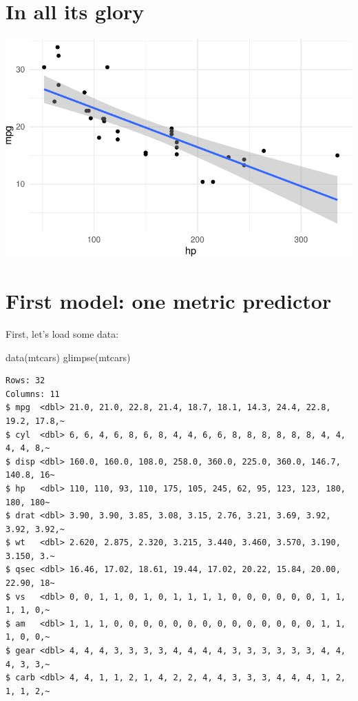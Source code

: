 \documentclass[
  letterpaper,
  DIV=11,
  numbers=noendperiod]{scrreprt}
\newenvironment{Shaded}{\begin{snugshade}}{\end{snugshade}}
\newcommand{\FunctionTok}[1]{\textcolor[rgb]{0.28,0.35,0.67}{#1}}
\newcommand{\NormalTok}[1]{\textcolor[rgb]{0.00,0.23,0.31}{#1}}
\theoremstyle{definition}
\theoremstyle{definition}
\theoremstyle{remark}
\begin{document}
\hypertarget{in-all-its-glory}{%
\section{In all its glory}\label{in-all-its-glory}}

\includegraphics{./regression1_files/figure-pdf/in-all-its-glory-1.pdf}

\hypertarget{first-model-one-metric-predictor}{%
\section{First model: one metric
predictor}\label{first-model-one-metric-predictor}}

First, let's load some data:

\begin{Shaded}
\begin{Highlighting}[]
\FunctionTok{data}\NormalTok{(mtcars)}
\FunctionTok{glimpse}\NormalTok{(mtcars)}
\end{Highlighting}
\end{Shaded}

\begin{verbatim}
Rows: 32
Columns: 11
$ mpg  <dbl> 21.0, 21.0, 22.8, 21.4, 18.7, 18.1, 14.3, 24.4, 22.8, 19.2, 17.8,~
$ cyl  <dbl> 6, 6, 4, 6, 8, 6, 8, 4, 4, 6, 6, 8, 8, 8, 8, 8, 8, 4, 4, 4, 4, 8,~
$ disp <dbl> 160.0, 160.0, 108.0, 258.0, 360.0, 225.0, 360.0, 146.7, 140.8, 16~
$ hp   <dbl> 110, 110, 93, 110, 175, 105, 245, 62, 95, 123, 123, 180, 180, 180~
$ drat <dbl> 3.90, 3.90, 3.85, 3.08, 3.15, 2.76, 3.21, 3.69, 3.92, 3.92, 3.92,~
$ wt   <dbl> 2.620, 2.875, 2.320, 3.215, 3.440, 3.460, 3.570, 3.190, 3.150, 3.~
$ qsec <dbl> 16.46, 17.02, 18.61, 19.44, 17.02, 20.22, 15.84, 20.00, 22.90, 18~
$ vs   <dbl> 0, 0, 1, 1, 0, 1, 0, 1, 1, 1, 1, 0, 0, 0, 0, 0, 0, 1, 1, 1, 1, 0,~
$ am   <dbl> 1, 1, 1, 0, 0, 0, 0, 0, 0, 0, 0, 0, 0, 0, 0, 0, 0, 1, 1, 1, 0, 0,~
$ gear <dbl> 4, 4, 4, 3, 3, 3, 3, 4, 4, 4, 4, 3, 3, 3, 3, 3, 3, 4, 4, 4, 3, 3,~
$ carb <dbl> 4, 4, 1, 1, 2, 1, 4, 2, 2, 4, 4, 3, 3, 3, 4, 4, 4, 1, 2, 1, 1, 2,~
\end{verbatim}
\end{document}
